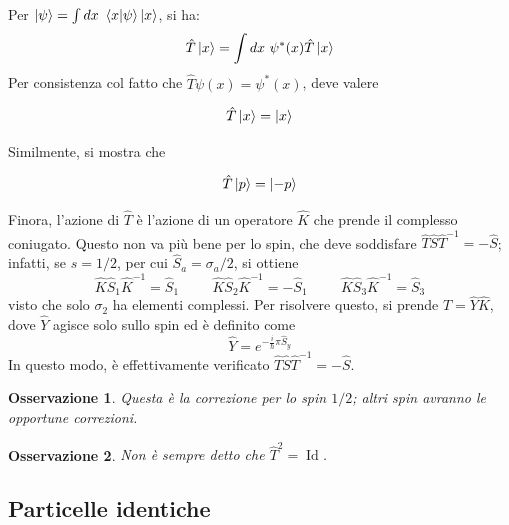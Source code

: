 \documentclass[11pt, a4paper]{scrartcl} %
\numberwithin{equation}{subsection}
\theoremstyle{style2}
\newtheorem{osservazione}{Osservazione}[section]
\theoremstyle{style1}
\newenvironment{boxenv}[1][]{
    \begin{eqbox}[#1]
    }{
   \end{eqbox}
}
\begin{document}
Per $\ket{\psi } = \int dx \ \braket{x|\psi } \ket{x} $, si ha:
\[
\hat{T} \ket{x}  = \int dx \ \psi ^* (x) \hat{T}\ket{x} 
\] 
Per consistenza col fatto che $\hat{T} \psi (x) = \psi ^* (x)$, deve valere
\begin{boxenv}[]
\begin{equation}
	\hat{T}\ket{x} = \ket{x} 
\end{equation}
\end{boxenv}
Similmente, si mostra che
\begin{boxenv}[]
\begin{equation}
	\hat{T}\ket{p}  = \ket{-p} 
\end{equation}
\end{boxenv}
Finora, l'azione di $\hat{T}$ \`e l'azione di un operatore $\hat{K}$ che prende il complesso coniugato. 
Questo non va pi\`u bene per lo spin, che deve soddisfare $\hat{T}\hat{S}\hat{T}^{-1} = - \hat{S}$;
infatti, se $s = 1 / 2$, per cui $\hat{S}_a = \sigma _a / 2$, si ottiene
\[
\hat{K}\hat{S}_1 \hat{K}^{-1}  = \hat{S}_1  \hspace{1cm} \hat{K}\hat{S}_2 \hat{K}^{-1}  = -\hat{S}_1 \hspace{1cm}\hat{K}\hat{S}_3 \hat{K}^{-1}  = \hat{S}_3
\] 
visto che solo $\sigma _2$ ha elementi complessi.
Per risolvere questo, si prende $\hat{T} = \hat{Y}\hat{K}$, dove $\hat{Y}$ agisce solo sullo spin ed \`e definito come 
\begin{equation}
	\hat{Y} = e^{-\frac{i}{\hbar } \pi \hat{S}_y} 
\end{equation}
In questo modo, \`e effettivamente verificato $\hat{T} \hat{S} \hat{T}^{-1}  =- \hat{S}$.
\begin{osservazione}
Questa \`e la correzione per lo spin $ 1 / 2$; altri spin avranno le opportune correzioni.
\end{osservazione}
\begin{osservazione}
Non \`e sempre detto che $\hat{T}^2 = \operatorname{Id} $.
\end{osservazione}
\subsection{Particelle identiche}
\end{document}
